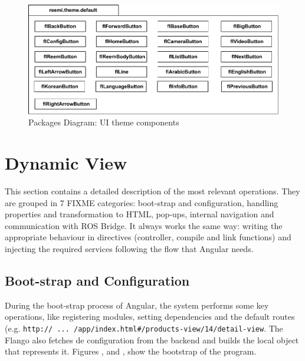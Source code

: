 \begin{figure}[htb]
    \centering
    \includegraphics{figures/design-package-uithemecomponents.pdf}
    \caption{Packages Diagram: UI theme components}
    \label{fig:pkg-themecomponents}
\end{figure}

\FloatBarrier

\section{Dynamic View}
This section contains a detailed description of the most relevant operations.
They are grouped in 7 FIXME categories: boot-strap and configuration, handling properties and transformation to \ac{HTML}, pop-ups, internal navigation and communication with ROS Bridge.
It always works the same way: writing the appropriate behaviour in directives (controller, compile and link functions) and injecting the required services following the flow that Angular needs.

\subsection{Boot-strap and Configuration}
During the boot-strap process of Angular, the system performs some key operations, like registering modules, setting dependencies and the default routes \\ (e.g. \texttt{http:// ... /app/index.html\#/products-view/14/detail-view}.
The Flango \cm also fetches de configuration from the backend and builds the local object that represents it.
Figures ,  and , show the bootstrap of the program.

